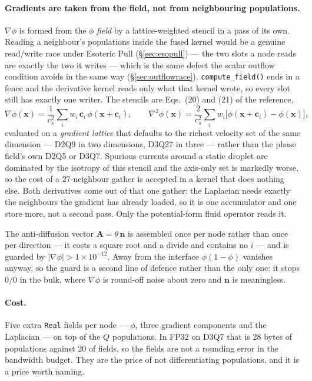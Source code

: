 \documentclass[11pt,a4paper]{article}
\newcommand{\code}[1]{\texttt{\small #1}}
\newcommand{\cs}{c_s}
\newcommand{\ci}{\bm{c}_i}
\newcommand{\nn}{\bm{n}}
\newcommand{\xx}{\bm{x}}
\newcommand{\e}[1]{\times 10^{#1}}
\begin{document}
\paragraph{Gradients are taken from the field, not from neighbouring
populations.} $\nabla\phi$ is formed from the $\phi$ \emph{field} by a
lattice-weighted stencil in a pass of its own. Reading a neighbour's populations
inside the fused kernel would be a genuine read/write race under Esoteric Pull
(\S\ref{sec:esopull}) --- the two slots a node reads are exactly the two it
writes --- which is the same defect the scalar outflow condition avoids in the
same way (\S\ref{sec:outflowrace}). \code{compute\_field()} ends in a fence and
the derivative kernel reads only what that kernel wrote, so every slot still has
exactly one writer. The stencils are Eqs.~(20) and (21) of the reference,
\begin{equation}
  \nabla\phi(\xx) = \frac{1}{\cs^2}\sum_i w_i\,\ci\,\phi(\xx+\ci),
  \qquad
  \nabla^2\phi(\xx) = \frac{2}{\cs^2}\sum_i w_i\big[\phi(\xx+\ci)-\phi(\xx)\big],
  \label{eq:acegrad}
\end{equation}
evaluated on a \emph{gradient lattice} that defaults to the richest velocity set
of the same dimension --- D2Q9 in two dimensions, D3Q27 in three --- rather than
the phase field's own D2Q5 or D3Q7. Spurious currents around a static droplet
are dominated by the isotropy of this stencil and the axis-only set is markedly
worse, so the cost of a 27-neighbour gather is accepted in a kernel that does
nothing else. Both derivatives come out of that one gather: the Laplacian needs
exactly the neighbours the gradient has already loaded, so it is one accumulator
and one store more, not a second pass. Only the potential-form fluid operator
reads it.

The anti-diffusion vector $\bm{A} = \theta\,\nn$ is assembled once per node
rather than once per direction --- it costs a square root and a divide and
contains no $i$ --- and is guarded by $|\nabla\phi| > 1\e{-12}$. Away from the
interface $\phi(1-\phi)$ vanishes anyway, so the guard is a second line of
defence rather than the only one: it stops $0/0$ in the bulk, where $\nabla\phi$
is round-off noise about zero and $\nn$ is meaningless.

\paragraph{Cost.} Five extra \code{Real} fields per node --- $\phi$, three
gradient components and the Laplacian --- on top of the $Q$ populations. In FP32
on D3Q7 that is 28 bytes of populations against 20 of fields, so the fields are
not a rounding error in the bandwidth budget. They are the price of not
differentiating populations, and it is a price worth naming.
\end{document}
